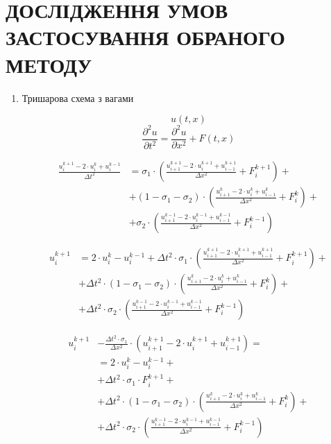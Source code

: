 \documentclass{article}
\begin{document}
    \newpage
    \section{ДОСЛІДЖЕННЯ УМОВ ЗАСТОСУВАННЯ ОБРАНОГО МЕТОДУ}
        \begin{enumerate}
            \item 
                Тришарова схема з вагами

                $$ u(t, x) $$
                $$ \frac{\partial^2{u}}{\partial{t^2}} = \frac{\partial^2{u}}{\partial{x^2}} + F(t, x) $$
                
                \begin{align*}
                    \frac{u_i^{k+1} - 2 \cdot u_i^{k} + u_i^{k-1}}{\Delta{t}^2}& = \sigma_1 \cdot \left(\frac{u_{i+1}^{k+1} - 2 \cdot u_i^{k+1} + u_{i-1}^{k+1}}{\Delta{x}^2} + F_i^{k+1}\right) + \\
                    & + \left(1 - \sigma_1 - \sigma_2 \right) \cdot \left(\frac{u_{i+1}^{k} - 2 \cdot u_i^{k} + u_{i-1}^{k}}{\Delta{x}^2} + F_i^{k}\right) + \\
                    & + \sigma_2 \cdot \left(\frac{u_{i+1}^{k-1} - 2 \cdot u_i^{k-1} + u_{i-1}^{k-1}}{\Delta{x}^2} + F_i^{k-1}\right)
                \end{align*}
                
                \begin{align*}
                    u_i^{k+1} & = 2 \cdot u_i^{k} - u_i^{k-1} + \Delta{t}^2 \cdot \sigma_1 \cdot \left(\frac{u_{i+1}^{k+1} - 2 \cdot u_i^{k+1} + u_{i-1}^{k+1}}{\Delta{x}^2} + F_i^{k+1}\right) + \\
                    & + \Delta{t}^2 \cdot \left(1 - \sigma_1 - \sigma_2 \right) \cdot \left(\frac{u_{i+1}^{k} - 2 \cdot u_i^{k} + u_{i-1}^{k}}{\Delta{x}^2} + F_i^{k}\right) + \\
                    & + \Delta{t}^2 \cdot \sigma_2 \cdot \left(\frac{u_{i+1}^{k-1} - 2 \cdot u_i^{k-1} + u_{i-1}^{k-1}}{\Delta{x}^2} + F_i^{k-1}\right)
                \end{align*}
                
                \begin{align*}
                    u_i^{k+1} & - \frac{\Delta{t}^2 \cdot \sigma_1}{\Delta{x}^2} \cdot \left(u_{i+1}^{k+1} - 2 \cdot u_i^{k+1} + u_{i-1}^{k+1}\right) = \\
                    & = 2 \cdot u_i^{k} - u_i^{k-1}  + \\
                    & + \Delta{t}^2 \cdot \sigma_1 \cdot F_i^{k+1} + \\
                    & + \Delta{t}^2 \cdot \left(1 - \sigma_1 - \sigma_2 \right) \cdot \left(\frac{u_{i+1}^{k} - 2 \cdot u_i^{k} + u_{i-1}^{k}}{\Delta{x}^2} + F_i^{k}\right) + \\
                    & + \Delta{t}^2 \cdot \sigma_2 \cdot \left(\frac{u_{i+1}^{k-1} - 2 \cdot u_i^{k-1} + u_{i-1}^{k-1}}{\Delta{x}^2} + F_i^{k-1}\right)
                \end{align*}
                

\end{enumerate}
\end{document}
